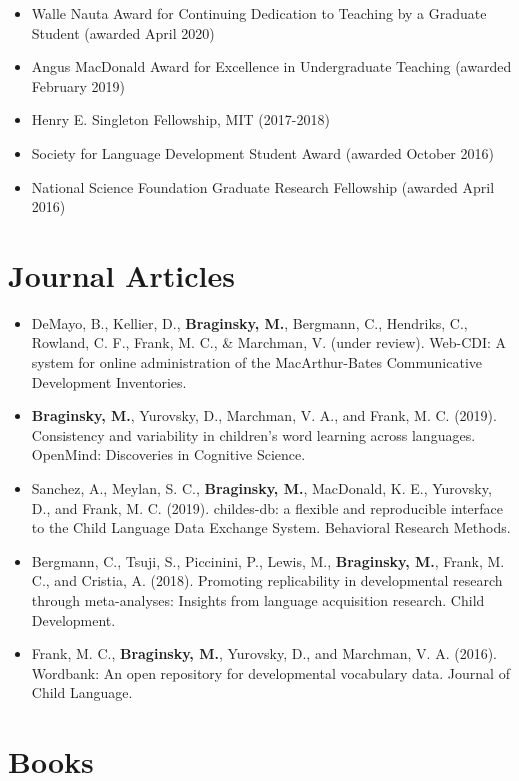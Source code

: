 \documentclass[11pt,]{article}
\providecommand{\tightlist}{%
  \setlength{\itemsep}{0pt}\setlength{\parskip}{0pt}}
\begin{document}
\begin{itemize}
\tightlist
\item
  Walle Nauta Award for Continuing Dedication to Teaching by a Graduate
  Student (awarded April 2020)
\item
  Angus MacDonald Award for Excellence in Undergraduate Teaching
  (awarded February 2019)
\item
  Henry E. Singleton Fellowship, MIT (2017-2018)
\item
  Society for Language Development Student Award (awarded October 2016)
\item
  National Science Foundation Graduate Research Fellowship (awarded
  April 2016)
\end{itemize}

\hypertarget{journal-articles}{%
\section{Journal Articles}\label{journal-articles}}

\begin{itemize}
\item
  DeMayo, B., Kellier, D., \textbf{Braginsky, M.}, Bergmann, C.,
  Hendriks, C., Rowland, C. F., Frank, M. C., \& Marchman, V. (under
  review). Web-CDI: A system for online administration of the
  MacArthur-Bates Communicative Development Inventories.
\item
  \textbf{Braginsky, M.}, Yurovsky, D., Marchman, V. A., and Frank, M.
  C. (2019). Consistency and variability in children's word learning
  across languages. OpenMind: Discoveries in Cognitive Science.
\item
  Sanchez, A., Meylan, S. C., \textbf{Braginsky, M.}, MacDonald, K. E.,
  Yurovsky, D., and Frank, M. C. (2019). childes-db: a flexible and
  reproducible interface to the Child Language Data Exchange System.
  Behavioral Research Methods.
\item
  Bergmann, C., Tsuji, S., Piccinini, P., Lewis, M., \textbf{Braginsky,
  M.}, Frank, M. C., and Cristia, A. (2018). Promoting replicability in
  developmental research through meta-analyses: Insights from language
  acquisition research. Child Development.
\item
  Frank, M. C., \textbf{Braginsky, M.}, Yurovsky, D., and Marchman, V.
  A. (2016). Wordbank: An open repository for developmental vocabulary
  data. Journal of Child Language.
\end{itemize}

\hypertarget{books}{%
\section{Books}\label{books}}
\end{document}
